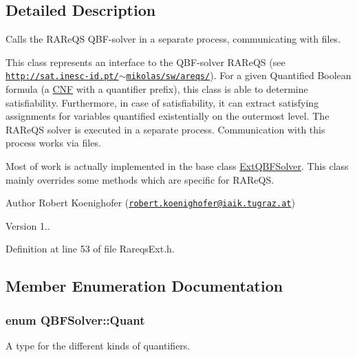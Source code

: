 \subsection{Detailed Description}
Calls the R\-A\-Re\-Q\-S Q\-B\-F-\/solver in a separate process, communicating with files. 

This class represents an interface to the Q\-B\-F-\/solver R\-A\-Re\-Q\-S (see \href{http://sat.inesc-id.pt/~mikolas/sw/areqs/}{\tt http\-://sat.\-inesc-\/id.\-pt/$\sim$mikolas/sw/areqs/}). For a given Quantified Boolean formula (a \hyperlink{classCNF}{C\-N\-F} with a quantifier prefix), this class is able to determine satisfiability. Furthermore, in case of satisfiability, it can extract satisfying assignments for variables quantified existentially on the outermost level. The R\-A\-Re\-Q\-S solver is executed in a separate process. Communication with this process works via files.

Most of work is actually implemented in the base class \hyperlink{classExtQBFSolver}{Ext\-Q\-B\-F\-Solver}. This class mainly overrides some methods which are specific for R\-A\-Re\-Q\-S.

\begin{DoxyAuthor}{Author}
Robert Koenighofer (\href{mailto:robert.koenighofer@iaik.tugraz.at}{\tt robert.\-koenighofer@iaik.\-tugraz.\-at}) 
\end{DoxyAuthor}
\begin{DoxyVersion}{Version}
1.. 
\end{DoxyVersion}


Definition at line 53 of file Rareqs\-Ext.\-h.



\subsection{Member Enumeration Documentation}
\hypertarget{classQBFSolver_ac091e263cb55286cc07b2451bcf4d3c7}{
\subsubsection[{Quant}]{\setlength{\rightskip}{0pt plus 5cm}enum {\bf Q\-B\-F\-Solver\-::\-Quant}\hspace{0.3cm}{\ttfamily [inherited]}}}\label{classQBFSolver_ac091e263cb55286cc07b2451bcf4d3c7}


A type for the different kinds of quantifiers. 

